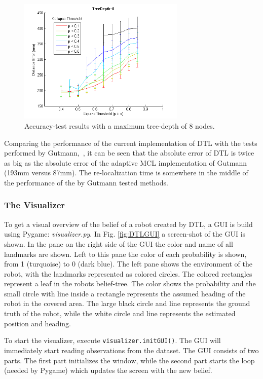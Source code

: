 \documentclass[11pt,a4paper,oneside]{article}
\begin{document}
\begin{figure}
\centering
\includegraphics[width=8cm]{threshold_t8.png}
\caption{Accuracy-test results with a maximum tree-depth of 8 nodes.}
\label{fig:DTLdepth8}
\end{figure}

Comparing the performance of the current implementation of DTL with the tests performed by Gutmann,~\cite{Gutmann2002}, it can be seen that the absolute error of DTL is twice as big as the absolute error of the adaptive MCL implementation of Gutmann (193mm versus 87mm). The re-localization time is somewhere in the middle of the performance of the by Gutmann tested methods. 

\subsubsection{The Visualizer}
To get a visual overview of the belief of a robot created by DTL, a GUI is build using Pygame: \textit{visualizer.py}. In Fig. \ref{fig:DTLGUI} a screen-shot of the GUI is shown. In the pane on the right side of the GUI the color and name of all landmarks are shown. Left to this pane the color of each probability is shown, from 1 (turquoise) to 0 (dark blue). The left pane shows the environment of the robot, with the landmarks represented as colored circles. The colored rectangles represent a leaf in the robots belief-tree. The color shows the probability and the small circle with line inside a rectangle represents the assumed heading of the robot in the covered area. The large black circle and line represents the ground truth of the robot, while the white circle and line represents the estimated position and heading.

To start the visualizer, execute \texttt{visualizer.initGUI()}. The GUI will immediately start reading observations from the dataset. The GUI consists of two parts. The first part initializes the window, while the second part starts the loop (needed by Pygame) which updates the screen with the new belief.
\end{document}

